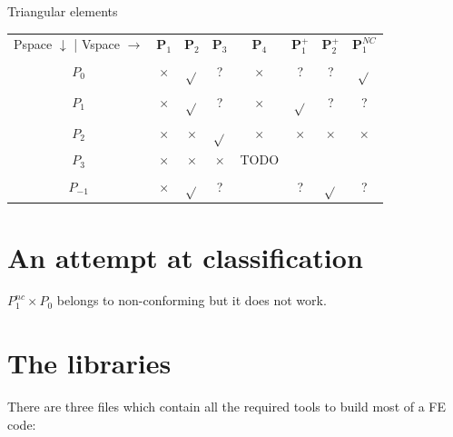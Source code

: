 \begin{center}
Triangular elements\\
\begin{tabular}{cccccccc}
\hline
Pspace $\downarrow$ | Vspace $\rightarrow$   
         & ${\bm P}_1$    & ${\bm P}_2$     & ${\bm P}_3$     & ${\bm P}_4$    & ${\bm P}_1^+$   & ${\bm P}_2^+$   & ${\bm P}_1^{NC}$  \\
$P_0$    & $\times$ & $\sqrt{}$ & ?         & $\times$ &  ?        &  ?        & $\sqrt{}$   \\
$P_1$    & $\times$ & $\sqrt{}$ & ?         & $\times$ & $\sqrt{}$ &  ?        & ?           \\
$P_2$    & $\times$ & $\times$  & $\sqrt{}$ & $\times$ & $\times$  & $\times$  & $\times$    \\
$P_3$    & $\times$ & $\times$  & $\times$  & TODO     &           &           &             \\ 
$P_{-1}$ & $\times$ & $\sqrt{}$ & ?         &          &  ?        & $\sqrt{}$ & ?           \\
\hline
\end{tabular}
\end{center}

\vspace{2cm}

\section*{An attempt at classification}



$P_1^{nc} \times P_0$ belongs to non-conforming but it does not work.

\newpage
\section*{The libraries}

There are three files which contain all the required tools to build most of a FE code:

